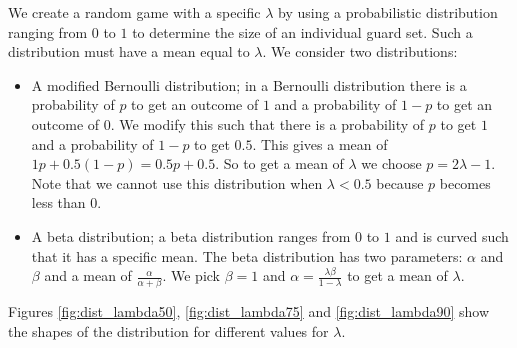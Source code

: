 We create a random game with a specific $\lambda$ by using a probabilistic distribution ranging from $0$ to $1$ to determine the size of an individual guard set. Such a distribution must have a mean equal to $\lambda$. We consider two distributions:
\begin{itemize}
	\item A modified Bernoulli distribution; in a Bernoulli distribution there is a probability of $p$ to get an outcome of $1$ and a probability of $1-p$ to get an outcome of $0$. We modify this such that there is a probability of $p$ to get $1$ and a probability of $1-p$ to get $0.5$. This gives a mean of $1p + 0.5(1-p) = 0.5p + 0.5$. So to get a mean of $\lambda$ we choose $p = 2\lambda - 1$. Note that we cannot use this distribution when $\lambda < 0.5$ because $p$ becomes less than $0$.
	\item A beta distribution; a beta distribution ranges from $0$ to $1$ and is curved such that it has a specific mean. The beta distribution has two parameters: $\alpha$ and $\beta$ and a mean of $\frac{\alpha}{\alpha+\beta}$. We pick $\beta=1$ and $\alpha = \frac{\lambda\beta}{1-\lambda}$ to get a mean of $\lambda$.
\end{itemize}
Figures \ref{fig:dist_lambda50}, \ref{fig:dist_lambda75} and \ref{fig:dist_lambda90} show the shapes of the distribution for different values for $\lambda$.
